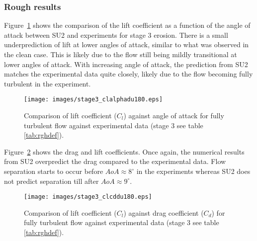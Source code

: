 \subsubsection{Rough results}
Figure~\ref{fig:du180clals3} shows the comparison of the lift coefficient as a function of the angle of attack between SU2 and experiments for stage 3 erosion. There is a small underprediction of lift at lower angles of attack, similar to what was observed in the clean case. This is likely due to the flow still being mildly transitional at lower angles of attack. With increasing angle of attack, the prediction from SU2 matches the experimental data quite closely, likely due to the flow becoming fully turbulent in the experiment.
\begin{figure}[h!]
    \centering
    \captionsetup{justification=centering}
    \texttt{[image: images/stage3\_clalphadu180.eps]}
    \caption{Comparison of lift coefficient ($C_l$) against angle of attack for fully turbulent flow against experimental data (stage 3 see table \ref{tab:rghdef}).}
    \label{fig:du180clals3}
\end{figure}
Figure~\ref{fig:du180clcds3} shows the drag and lift coefficients. Once again, the numerical results from SU2 overpredict the drag compared to the experimental data. Flow separation starts to occur before $AoA\approx 8^{\circ}$ in the experiments whereas SU2 does not predict separation till after $AoA\approx 9^{\circ}$.
\begin{figure}[h!]
    \centering
    \captionsetup{justification=centering}
    \texttt{[image: images/stage3\_clcddu180.eps]}
    \caption{Comparison of lift coefficient ($C_l$) against drag coefficient ($C_d$) for fully turbulent flow against experimental data (stage 3 see table \ref{tab:rghdef}).}
    \label{fig:du180clcds3}
\end{figure}

